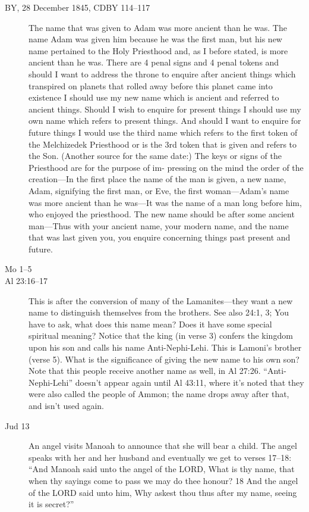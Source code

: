 		\begin{description}
		\item[BY, 28 December 1845, CDBY 114--117] The name that was given to Adam was more ancient than he was. The name Adam was given him because he was the first man, but his new name pertained to the Holy Priesthood and, as I before stated, is more ancient than he was. There are 4 penal signs and 4 penal tokens and should I want to address the throne to enquire after ancient things which transpired on planets that rolled away before this planet came into existence I should use my new name which is ancient and referred to ancient things. Should I wish to enquire for present things I should use my own name which refers to present things. And should I want to enquire for future things I would use the third name which refers to the first token of the Melchizedek Priesthood or is the 3rd token that is given and refers to the Son.
		(Another source for the same date:)
		The keys or signs of the Priesthood are for the purpose of im- pressing on the mind the order of the creation---In the first place the name of the man is given, a new name, Adam, signifying the first man, or Eve, the first woman---Adam's name was more ancient than he was---It was the name of a man long before him, who enjoyed the priesthood. The new name should be after some ancient man---Thus with your ancient name, your modern name, and the name that was last given you, you enquire concerning things past present and future. 
		\item[Mo 1--5]
		\item[Al 23:16--17] This is after the conversion of many of the Lamanites---they want a new name to distinguish themselves from the brothers. See also 24:1, 3;
		You have to ask, what does this name mean? Does it have some special spiritual meaning? Notice that the king (in verse 3) confers the kingdom upon his son and calls his name Anti-Nephi-Lehi. This is Lamoni's brother (verse 5). What is the significance of giving the new name to his own son?
		Note that this people receive another name as well, in Al 27:26. ``Anti-Nephi-Lehi'' doesn't appear again until Al 43:11, where it's noted that they were also called the people of Ammon; the name drops away after that, and isn't used again.
		\item[Jud 13] An angel visits Manoah to announce that she will bear a child. The angel speaks with her and her husband and eventually we get to verses 17--18: ``And Manoah said unto the angel of the LORD, What is thy name, that when thy sayings come to pass we may do thee honour? 18 And the angel of the LORD said unto him, Why askest thou thus after my name, seeing it is secret?''

\end{description}
